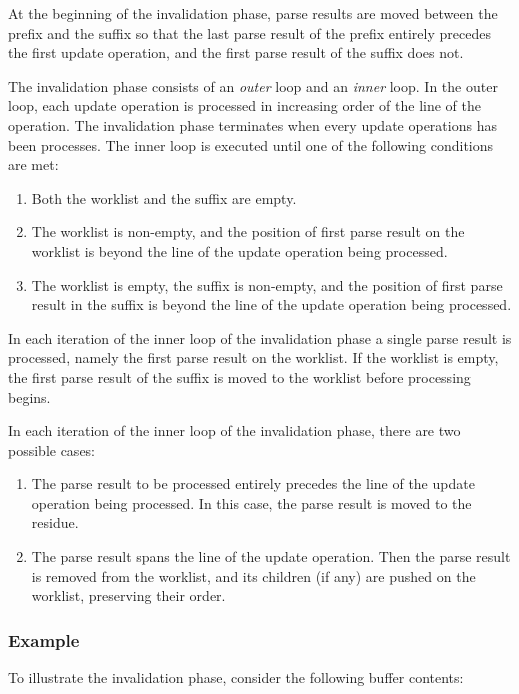 At the beginning of the invalidation phase, parse results are moved
between the prefix and the suffix so that the last parse result of the
prefix entirely precedes the first update operation, and the first
parse result of the suffix does not.

The invalidation phase consists of an \emph{outer} loop and an
\emph{inner} loop.  In the outer loop, each update operation is
processed in increasing order of the line of the operation.  The
invalidation phase terminates when every update operations has been
processes.  The inner loop is executed until one of the following
conditions are met:

\begin{enumerate}
\item Both the worklist and the suffix are empty.
\item The worklist is non-empty, and the position of first parse
  result on the worklist is beyond the line of the update operation
  being processed.
\item The worklist is empty, the suffix is non-empty, and the position
  of first parse result in the suffix is beyond the line of the update
  operation being processed.
\end{enumerate}

In each iteration of the inner loop of the invalidation phase a single
parse result is processed, namely the first parse result on the
worklist.  If the worklist is empty, the first parse result of the
suffix is moved to the worklist before processing begins.

In each iteration of the inner loop of the invalidation phase, there
are two possible cases:

\begin{enumerate}
\item The parse result to be processed entirely precedes the line of
  the update operation being processed.  In this case, the parse
  result is moved to the residue.
\item The parse result spans the line of the update operation.  Then
  the parse result is removed from the worklist, and its children (if
  any) are pushed on the worklist, preserving their order.
\end{enumerate}

\subsubsection{Example}

To illustrate the invalidation phase, consider the following buffer
contents:

